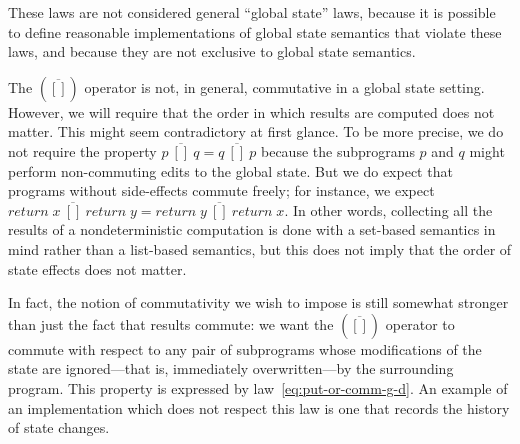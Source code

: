 \documentclass{llncs}
\newcommand{\Varid}[1]{\mathit{#1}}
\let\Varid\mathit
\begin{document}
These laws are not considered general ``global state'' laws, because it is
possible to define reasonable implementations of global state semantics that
violate these laws, and because they are not exclusive to global state
semantics.

The \ensuremath{(\overline{[\!]})} operator is not, in general, commutative in a global state setting.
However, we will require that the order in which results are computed does not
matter.
This might seem contradictory at first glance.
To be more precise, we do not require the property
\ensuremath{\Varid{p}~\overline{[\!]}~\Varid{q}\mathrel{=}\Varid{q}~\overline{[\!]}~\Varid{p}} because the subprograms \ensuremath{\Varid{p}} and \ensuremath{\Varid{q}} might perform
non-commuting edits to the global state.
But we do expect that programs without side-effects commute freely;
for instance, we expect \ensuremath{\Varid{return}\;\Varid{x}~\overline{[\!]}~\Varid{return}\;\Varid{y}\mathrel{=}\Varid{return}\;\Varid{y}~\overline{[\!]}~\Varid{return}\;\Varid{x}}.
In other words, collecting all the results of a nondeterministic computation is
done with a set-based semantics in mind rather than a list-based semantics,
but this does not imply that the order of state effects does not matter.

In fact, the notion of commutativity we wish to impose is still somewhat
stronger than just the fact that results commute: we want the \ensuremath{(\overline{[\!]})} operator
to commute with respect to any pair of subprograms whose modifications of the
state are ignored---that is, immediately overwritten---by the
surrounding program.
This property is expressed by law~\eqref{eq:put-or-comm-g-d}.
An example of an implementation which does not respect this law is one that
records the history of state changes.
\end{document}
